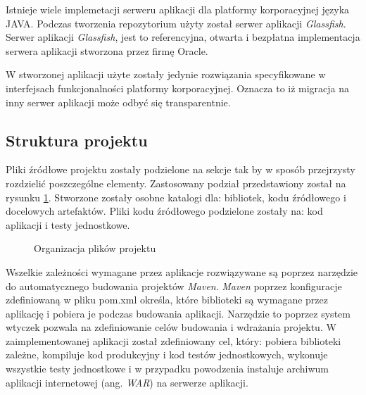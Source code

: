 Istnieje wiele implemetacji serweru aplikacji dla platformy korporacyjnej języka JAVA. Podczas tworzenia repozytorium użyty został serwer aplikacji \textit{Glassfish}. Serwer aplikacji \textit{Glassfish}, jest to referencyjna, otwarta i bezpłatna implementacja serwera aplikacji stworzona przez firmę Oracle. 

W stworzonej aplikacji użyte zostały jedynie rozwiązania specyfikowane w interfejsach funkcjonalności platformy korporacyjnej. Oznacza to iż migracja na inny serwer aplikacji może odbyć się transparentnie.
\subsection{Struktura projektu}
Pliki źródłowe projektu zostały podzielone na sekcje tak by w sposób przejrzysty rozdzielić poszczególne elementy. Zastosowany podział przedstawiony został na rysunku \ref{fig:stukturaProjektu}. Stworzone zostały osobne katalogi dla: bibliotek, kodu źródłowego i docelowych artefaktów. Pliki kodu źródłowego podzielone zostały na: kod aplikacji i testy jednostkowe.

\begin{figure}[h!]

\caption{Organizacja plików projektu}
\label{fig:stukturaProjektu}
\end{figure}

Wszelkie zależności wymagane przez aplikacje rozwiązywane są poprzez narzędzie do automatycznego budowania projektów \textit{Maven}. \textit{Maven} poprzez konfiguracje zdefiniowaną w pliku pom.xml określa, które biblioteki są wymagane przez aplikację i pobiera je podczas budowania aplikacji. Narzędzie to poprzez system wtyczek pozwala na zdefiniowanie celów budowania i wdrażania projektu. W zaimplementowanej aplikacji został zdefiniowany cel, który: pobiera biblioteki zależne, kompiluje kod produkcyjny i kod testów jednostkowych, wykonuje wszystkie testy jednostkowe i w przypadku powodzenia instaluje archiwum aplikacji internetowej (ang. \textit{WAR}) na serwerze aplikacji.


